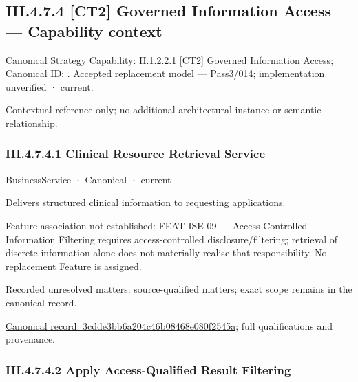 \subsection*{III.4.7.4 [CT2] Governed Information Access — Capability context}
\label{navigation:III.4.7.4}

{\small Canonical Strategy Capability: II.1.2.2.1 \hyperref[element:43146a505617462f96c38459b465bcf1]{[CT2] Governed Information Access}; Canonical ID: \texttt{}. Accepted replacement model — Pass3/014; implementation unverified · current.}\par
Contextual reference only; no additional architectural instance or semantic relationship.\par
\subsubsection*{III.4.7.4.1 Clinical Resource Retrieval Service}
\label{navigation:III.4.7.4.1}

\label{element:3cdde3bb6a204c46b08468e080f2545a}
{\small BusinessService · Canonical · current}\par

Delivers structured clinical information to requesting applications.



Feature association not established: FEAT-ISE-09 — Access-Controlled Information Filtering requires access-controlled disclosure/filtering; retrieval of discrete information alone does not materially realise that responsibility. No replacement Feature is assigned.


{\small Recorded unresolved matters: source-qualified matters; exact scope remains in the canonical record.}\par
{\footnotesize \href{../../../../../../../../continuum/business/business-service/3cdde3bb6a204c46b08468e080f2545a.md}{Canonical record: 3cdde3bb6a204c46b08468e080f2545a}; full qualifications and provenance.}\par
\subsubsection*{III.4.7.4.2 Apply Access-Qualified Result Filtering}
\label{navigation:III.4.7.4.2}

